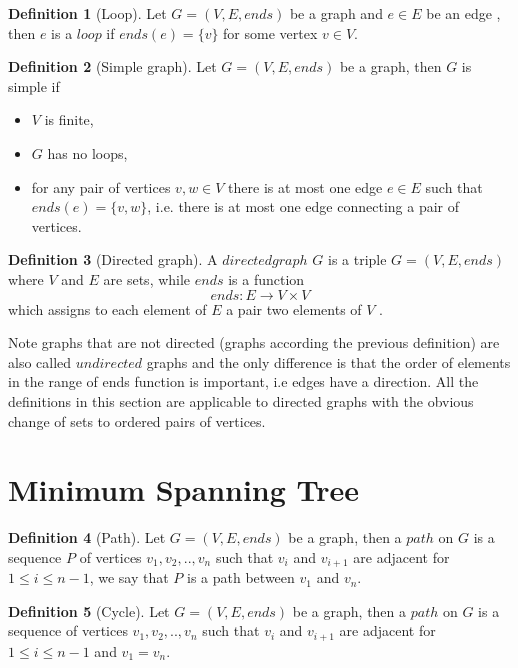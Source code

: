 \documentclass{report}
\theoremstyle{plain}
\theoremstyle{definition}
\newtheorem{definition}{Definition}
\theoremstyle{remark}
\begin{document}
\begin{definition}[Loop]
Let $G = (V, E, ends)$ be a graph and $e \in E$ be an edge , then $e$ is a $loop$ if $ends(e) = \{v\}$ for some vertex $v \in V$.
\end{definition}

\begin{definition}[Simple graph]
Let $G = (V, E, ends)$ be a graph, then $G$ is simple if
\begin{itemize}
\item $V$ is finite,
\item $G$ has no loops,
\item for any pair of vertices $v,w \in V$ there is at most one edge $e \in E$ such that $ends(e) = \{v, w\}$, i.e. there is at most one edge connecting a pair of vertices.
\end{itemize}
\end{definition}

\begin{definition}[Directed graph]
A $directed graph$  $G$ is a triple $G = (V, E, ends)$ where $V$ and $E$ are sets, while $ends$ is a function 
  \begin{equation}
  ends:E\to V \times V
  \end{equation}
which assigns to each element of $E$ a pair two elements of $V$ .
\end{definition}

Note graphs that are not directed (graphs according the previous definition) are also called $undirected$ graphs and the only difference is that the order of elements in the range of ends function is important, i.e edges have a direction. All the definitions in this section are applicable to directed graphs with the obvious change of sets to ordered pairs of vertices.

\section*{Minimum Spanning Tree}

\begin{definition}[Path]
Let $G = (V, E, ends)$ be a graph, then a $path$ on $G$ is a sequence $P$ of vertices $v_1,v_2,..,v_n$ such that $v_i$ and $v_{i+1}$ are adjacent for $1 \leq i \leq n - 1$, we say that $P$ is a path between $v_1$ and $v_n$.
\end{definition}

\begin{definition}[Cycle]
Let $G = (V, E, ends)$ be a graph, then a $path$ on $G$ is a sequence of vertices $v_1,v_2,..,v_n$ such that $v_i$ and $v_{i+1}$ are adjacent for $1 \leq i \leq n - 1$ and $v_1=v_n$.
\end{definition}
\end{document}
